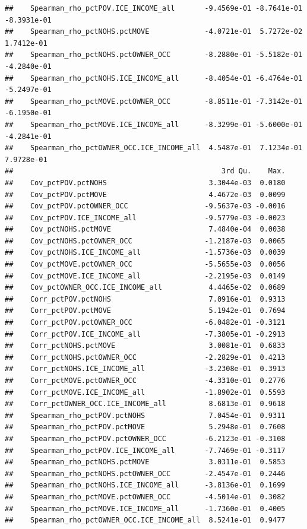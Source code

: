\documentclass[
]{book}
\begin{document}
\begin{lstlisting}
##    Spearman_rho_pctPOV.ICE_INCOME_all       -9.4569e-01 -8.7641e-01 -8.3931e-01
##    Spearman_rho_pctNOHS.pctMOVE             -4.0721e-01  5.7272e-02  1.7412e-01
##    Spearman_rho_pctNOHS.pctOWNER_OCC        -8.2880e-01 -5.5182e-01 -4.2840e-01
##    Spearman_rho_pctNOHS.ICE_INCOME_all      -8.4054e-01 -6.4764e-01 -5.2497e-01
##    Spearman_rho_pctMOVE.pctOWNER_OCC        -8.8511e-01 -7.3142e-01 -6.1950e-01
##    Spearman_rho_pctMOVE.ICE_INCOME_all      -8.3299e-01 -5.6000e-01 -4.2841e-01
##    Spearman_rho_pctOWNER_OCC.ICE_INCOME_all  4.5487e-01  7.1234e-01  7.9728e-01
##                                                 3rd Qu.    Max.
##    Cov_pctPOV.pctNOHS                        3.3044e-03  0.0180
##    Cov_pctPOV.pctMOVE                        4.4672e-03  0.0099
##    Cov_pctPOV.pctOWNER_OCC                  -9.5637e-03 -0.0016
##    Cov_pctPOV.ICE_INCOME_all                -9.5779e-03 -0.0023
##    Cov_pctNOHS.pctMOVE                       7.4840e-04  0.0038
##    Cov_pctNOHS.pctOWNER_OCC                 -1.2187e-03  0.0065
##    Cov_pctNOHS.ICE_INCOME_all               -1.5736e-03  0.0039
##    Cov_pctMOVE.pctOWNER_OCC                 -5.5655e-03  0.0056
##    Cov_pctMOVE.ICE_INCOME_all               -2.2195e-03  0.0149
##    Cov_pctOWNER_OCC.ICE_INCOME_all           4.4465e-02  0.0689
##    Corr_pctPOV.pctNOHS                       7.0916e-01  0.9313
##    Corr_pctPOV.pctMOVE                       5.1942e-01  0.7694
##    Corr_pctPOV.pctOWNER_OCC                 -6.0482e-01 -0.3121
##    Corr_pctPOV.ICE_INCOME_all               -7.3805e-01 -0.2913
##    Corr_pctNOHS.pctMOVE                      3.0081e-01  0.6833
##    Corr_pctNOHS.pctOWNER_OCC                -2.2829e-01  0.4213
##    Corr_pctNOHS.ICE_INCOME_all              -3.2308e-01  0.3913
##    Corr_pctMOVE.pctOWNER_OCC                -4.3310e-01  0.2776
##    Corr_pctMOVE.ICE_INCOME_all              -1.8902e-01  0.5593
##    Corr_pctOWNER_OCC.ICE_INCOME_all          8.6813e-01  0.9618
##    Spearman_rho_pctPOV.pctNOHS               7.0454e-01  0.9311
##    Spearman_rho_pctPOV.pctMOVE               5.2948e-01  0.7608
##    Spearman_rho_pctPOV.pctOWNER_OCC         -6.2123e-01 -0.3108
##    Spearman_rho_pctPOV.ICE_INCOME_all       -7.7469e-01 -0.3117
##    Spearman_rho_pctNOHS.pctMOVE              3.0311e-01  0.5853
##    Spearman_rho_pctNOHS.pctOWNER_OCC        -2.4547e-01  0.2446
##    Spearman_rho_pctNOHS.ICE_INCOME_all      -3.8136e-01  0.1699
##    Spearman_rho_pctMOVE.pctOWNER_OCC        -4.5014e-01  0.3082
##    Spearman_rho_pctMOVE.ICE_INCOME_all      -1.7360e-01  0.4005
##    Spearman_rho_pctOWNER_OCC.ICE_INCOME_all  8.5241e-01  0.9477

\end{lstlisting}
\end{document}
